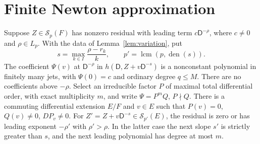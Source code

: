 \documentclass{article}
\newcommand{\DD}{\mathsf D}
\newcommand{\Sf}{\mathcal S}
\begin{document}
\section{Finite Newton approximation}\label{sec:newton}
\begin{lemma}\label{lem:step}
Suppose $Z\in\Sf_p(F)$ has nonzero residual with leading term $c\DD^{-\rho}$, where $c\ne0$ and $\rho\in L_p$. With the data of Lemma~\ref{lem:variation}, put
\[
 s=\max_{k\in I}\frac{\rho-r_k}{k},\qquad
 p'=\operatorname{lcm}(p,\operatorname{den}(s)).
\]
The coefficient $\Psi(v)$ at $\DD^{-\rho}$ in $h(\DD,Z+v\DD^{-s})$ is a nonconstant polynomial in finitely many jets, with $\Psi(0)=c$ and ordinary degree $q\leq M$. There are no coefficients above $-\rho$. Select an irreducible factor $P$ of maximal total differential order, with exact multiplicity $m$, and write $\Psi=P^mQ$, $P\nmid Q$. There is a commuting differential extension $E/F$ and $v\in E$ such that $P(v)=0$, $Q(v)\ne0$, $DP_v\ne0$. For $Z'=Z+v\DD^{-s}\in\Sf_{p'}(E)$, the residual is zero or has leading exponent $-\rho'$ with $\rho'>\rho$. In the latter case the next slope $s'$ is strictly greater than $s$, and the next leading polynomial has degree at most $m$.
\end{lemma}
\end{document}
